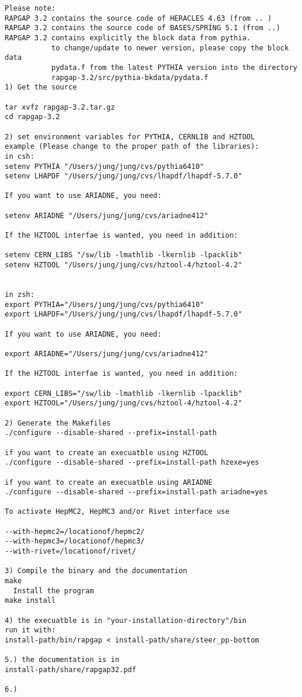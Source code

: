\documentclass[10pt]{article} \usepackage{dina4}
\begin{document}
\begin{verbatim}
Please note:
RAPGAP 3.2 contains the source code of HERACLES 4.63 (from .. )
RAPGAP 3.2 contains the source code of BASES/SPRING 5.1 (from ..)
RAPGAP 3.2 contains explicitly the block data from pythia.
           to change/update to newer version, please copy the block data
           pydata.f from the latest PYTHIA version into the directory
           rapgap-3.2/src/pythia-bkdata/pydata.f
1) Get the source

tar xvfz rapgap-3.2.tar.gz
cd rapgap-3.2

2) set environment variables for PYTHIA, CERNLIB and HZTOOL
example (Please change to the proper path of the libraries):
in csh: 
setenv PYTHIA "/Users/jung/jung/cvs/pythia6410"
setenv LHAPDF "/Users/jung/jung/cvs/lhapdf/lhapdf-5.7.0"

If you want to use ARIADNE, you need:

setenv ARIADNE "/Users/jung/jung/cvs/ariadne412"

If the HZTOOL interfae is wanted, you need in addition:

setenv CERN_LIBS "/sw/lib -lmathlib -lkernlib -lpacklib"
setenv HZTOOL "/Users/jung/jung/cvs/hztool-4/hztool-4.2"


in zsh:
export PYTHIA="/Users/jung/jung/cvs/pythia6410"
export LHAPDF="/Users/jung/jung/cvs/lhapdf/lhapdf-5.7.0"

If you want to use ARIADNE, you need:

export ARIADNE="/Users/jung/jung/cvs/ariadne412"

If the HZTOOL interfae is wanted, you need in addition:

export CERN_LIBS="/sw/lib -lmathlib -lkernlib -lpacklib"
export HZTOOL="/Users/jung/jung/cvs/hztool-4/hztool-4.2"

2) Generate the Makefiles
./configure --disable-shared --prefix=install-path

if you want to create an execuatble using HZTOOL 
./configure --disable-shared --prefix=install-path hzexe=yes

if you want to create an execuatble using ARIADNE
./configure --disable-shared --prefix=install-path ariadne=yes

To activate HepMC2, HepMC3 and/or Rivet interface use 

--with-hepmc2=/locationof/hepmc2/
--with-hepmc3=/locationof/hepmc3/
--with-rivet=/locationof/rivet/

3) Compile the binary and the documentation
make
  Install the program
make install

4) the execuatble is in "your-installation-directory"/bin
run it with:
install-path/bin/rapgap < install-path/share/steer_pp-bottom

5.) the documentation is in
install-path/share/rapgap32.pdf

6.) 
\end{verbatim}
\end{document}

